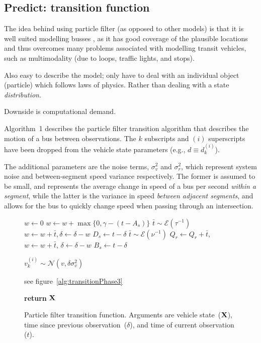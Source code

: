 \documentclass[draftcls,a4paper,onecolumn]{IEEEtran}\usepackage[]{graphicx}\usepackage[]{color}
\begin{document}
\subsection{Predict: transition function}
The idea behind using particle filter (as opposed to other models)
is that it is well suited modelling busses \cite{Hans2015},
as it has good coverage of the plausible locations and thus overcomes
many problems associated with modelling transit vehicles,
such as multimodality (due to loops, traffic lights, and stops).

Also easy to describe the model;
only have to deal with an individual object (particle) which follows laws of physics.
Rather than dealing with a state \emph{distribution}.

Downside is computational demand.

Algorithm~1 describes the particle filter transition algorithm that
describes the motion of a bus between observations.
The $k$ subscripts and $(i)$ superscripts have been dropped from the
vehicle state parameters (e.g., $d \equiv d_k^{(i)}$).

The additional parameters are the noise terms, $\sigma_v^2$ and $\sigma_r^2$,
which represent system noise and between-segment speed variance respectively.
The former is assumed to be small, and represents the average change in speed
of a bus per second \emph{within a segment},
while the latter is the variance in speed \emph{between adjacent segments},
and allows for the bus to quickly change speed when passing through an intersection.


\begin{figure}[bt]
  \begin{algorithmic}
    
    \State $w\gets 0$
      \State $w\gets w + \max\{0, \gamma - (t - A_s)\}$
      \State $\bar t \sim \mathcal{E}(\tau^{-1})$
      \State $w\gets w + \bar t, \delta\gets \delta - w$
        \State $D_s\gets t - \delta$
      \EndIf
      \State $\bar t \sim \mathcal{E}(\nu^{-1})$
      \State $Q_r\gets Q_r + \bar t$, $w\gets w+\bar t$, $\delta\gets \delta - w$
        \State $B_s\gets t - \delta$
      \EndIf
    \EndIf
    \EndPhase
    
    
    \State $v_k^{(i)}\sim \mathcal{N}(v, \delta\sigma_v^2)$
    \EndPhase
    
    \State see figure~\ref{alg:transitionPhase3}
    \EndPhase
    
    \State \textbf{return} $\mathbf{X}$
    \EndFunction
  \end{algorithmic}
  \caption{Particle filter transition function. Arguments are vehicle state~($\mathbf{X}$), time since previous observation~($\delta$), and time of current observation ($t$).}
  \label{alg:transition}
\end{figure}
\end{document}
